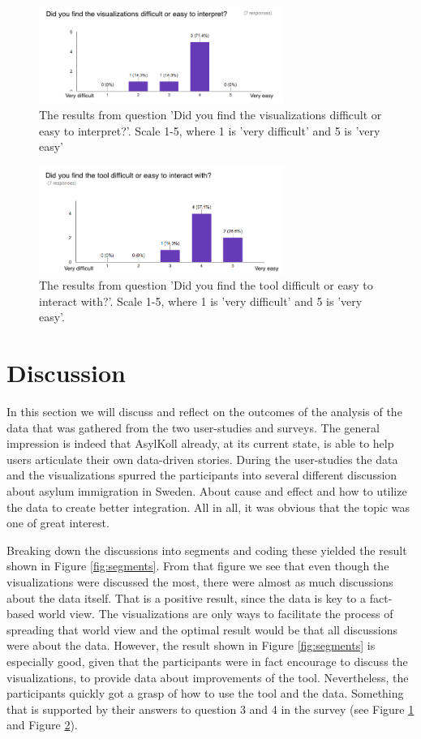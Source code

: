 \documentclass{acmtog} %
\begin{document}
\begin{figure}[!ht]
\centering
\includegraphics[width=8cm]{img/q3_en.png}
\caption{The results from question 'Did you find the visualizations difficult or easy to interpret?'. Scale 1-5, where 1 is 'very difficult' and 5 is 'very easy'}
\label{fig:q3}
\end{figure}

\begin{figure}[!ht]
\centering
\includegraphics[width=8cm]{img/q4_en.png}
\caption{The results from question 'Did you find the tool difficult or easy to interact with?'. Scale 1-5, where 1 is 'very difficult' and 5 is 'very easy'.}
\label{fig:q4}
\end{figure}

\section{Discussion}
\label{sec:discussion}

In this section we will discuss and reflect on the outcomes of the analysis of the data that was gathered from the two user-studies and surveys. The general impression is indeed that AsylKoll already, at its current state, is able to help users articulate their own data-driven stories. During the user-studies the data and the visualizations spurred the participants into several different discussion about asylum immigration in Sweden. About cause and effect and how to utilize the data to create better integration. All in all, it was obvious that the topic was one of great interest. 

Breaking down the discussions into segments and coding these yielded the result shown in Figure \ref{fig:segments}. From that figure we see that even though the visualizations were discussed the most, there were almost as much discussions about the data itself. That is a positive result, since the data is key to a fact-based world view. The visualizations are only ways to facilitate the process of spreading that world view and the optimal result would be that all discussions were about the data. However, the result shown in Figure \ref{fig:segments} is especially good, given that the participants were in fact encourage to discuss the visualizations, to provide data about improvements of the tool. Nevertheless, the participants quickly got a grasp of how to use the tool and the data. Something that is supported by their answers to question 3 and 4 in the survey (see Figure \ref{fig:q3} and Figure \ref{fig:q4}).
\end{document}
